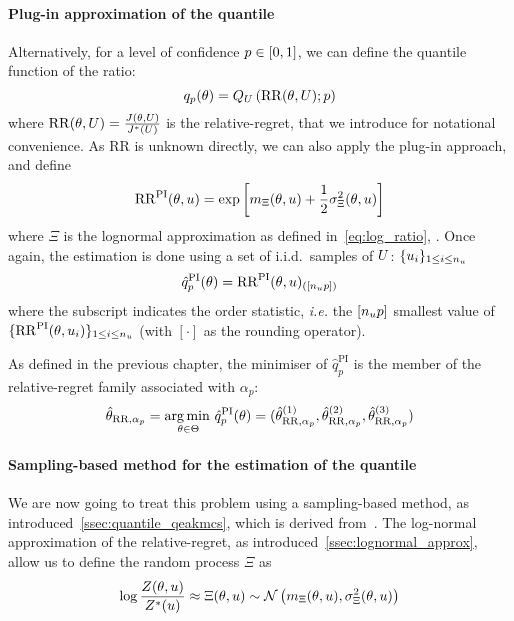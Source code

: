\documentclass[../../Main_ManuscritThese.tex]{subfiles}
\begin{document}
\paragraph{Plug-in approximation of the quantile}
Alternatively, for a level of confidence
$p \in \interval{0}{1}$, we can define the quantile function of the
ratio:
\begin{equation}
  q_p(\theta) = Q_{U}\left(\mathrm{RR}(\theta, U);p \right)
\end{equation}
where $\mathrm{RR}(\theta, U)=\frac{J(\theta, U)}{J^*(U)}$ is the
relative-regret, that we introduce for notational convenience.  As
$\mathrm{RR}$ is unknown directly, we can also apply the plug-in
approach, and define
\begin{equation}
  \mathrm{RR}^{\mathrm{PI}}(\theta, u) = \exp\left[m_{\Xi}(\theta, u) + \frac{1}{2}\sigma^2_{\Xi}(\theta, u)\right]
\end{equation}
where $\Xi$ is the lognormal approximation as defined
in~\cref{eq:log_ratio}, . Once again, the
estimation is done using a set of i.i.d.\ samples of $U$:
$\{u_i\}_{1\leq i \leq n_{u}}$
\begin{equation}
  \label{eq:RRPI}
  \hat{q}_p^{\mathrm{PI}}(\theta) = {\mathrm{RR}}^{\mathrm{PI}}(\theta, u)_{(\left[n_{u}p\right])}
\end{equation}
where the subscript indicates the order statistic, \emph{i.e.} the
$\left[n_{u}p\right]$ smallest value of
$\{\mathrm{RR}^\mathrm{PI}(\theta,u_i)\}_{1\leq i\leq n_u}$ (with
$[\cdot]$ as the rounding operator). 

As defined in the previous chapter, the minimiser of
$\hat{q}_p^{\mathrm{PI}}$ is the member of the relative-regret family
associated with $\alpha_p$:
\begin{equation}
  \hat{\theta}_{\mathrm{RR},\alpha_p} = \operatorname*{arg\,min \,}_{\theta \in \Theta} \hat{q}^{\mathrm{PI}}_p(\theta) = (\hat{\theta}^{(1)}_{\mathrm{RR},\alpha_p}, \hat{\theta}^{(2)}_{\mathrm{RR},\alpha_p},\hat{\theta}^{(3)}_{\mathrm{RR},\alpha_p})
\end{equation}
\paragraph{Sampling-based method for the estimation of the quantile}
We are now going to treat this problem using a sampling-based method,
as introduced~\cref{ssec:quantile_qeakmcs}, which is derived
from~\cite{razaaly_rare_2019}.  The log-normal approximation of the
relative-regret, as introduced~\cref{ssec:lognormal_approx}, allow us
to define the random process $\Xi$ as
\begin{equation}
  \log \frac{Z(\theta, u)}{Z^*(u)} \approx \Xi(\theta, u) \sim \mathcal{N}\left(m_{\Xi}(\theta, u),\sigma^2_{\Xi}(\theta, u)\right)
\end{equation}
\end{document}
